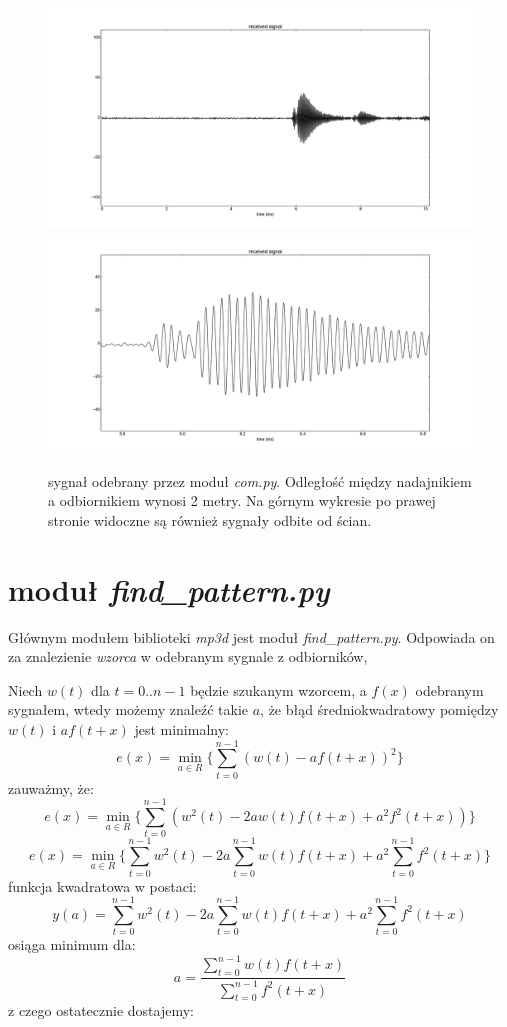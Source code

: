 \begin{figure}[h!]
    \centering
    \includegraphics[width=1.15\textwidth, trim= 47mm 0mm 0mm 0mm,clip]{com_output_2m_1}
    \includegraphics[width=1.15\textwidth, trim= 47mm 0mm 0mm 0mm,clip]{com_output_2m_2}
    \caption{sygnał odebrany przez moduł \textit{com.py}. 
    Odległość między nadajnikiem a odbiornikiem wynosi 2 metry.
    Na górnym wykresie po prawej stronie widoczne są również sygnały odbite od ścian.
    }
    \label{fig:com_output_2m}
\end{figure}


\section{moduł \textit{find\_pattern.py}}

Głównym modułem biblioteki \textit{mp3d} jest moduł \textit{find\_pattern.py}.
Odpowiada on za znalezienie \textit{wzorca} w odebranym sygnale z odbiorników,

Niech $w(t)$  dla $t = 0..n-1$ będzie szukanym wzorcem, a $f(x)$ odebranym sygnałem,
wtedy możemy znaleźć takie $a$, że błąd średniokwadratowy pomiędzy $w(t)$ i $a f(t+x)$ jest minimalny:
\[
  e(x) = \min_{a \in R} \{ \sum_{t=0}^{n-1}  (w(t) - a f(t+x))^2 \}
\]
zauważmy, że:
\[
  e(x) = \min_{a \in R} \{ \sum_{t=0}^{n-1}  (w^2(t) -2a w(t) f(t+x) + a^2 f^2(t+x)) \}
\]
\[
  e(x) = \min_{a \in R} \{ \sum_{t=0}^{n-1}  w^2(t) -2a \sum_{t=0}^{n-1}  w(t) f(t+x) + a^2 \sum_{t=0}^{n-1} f^2(t+x) \}
\]
funkcja kwadratowa w postaci:
\[
  y(a) = \sum_{t=0}^{n-1}  w^2(t) -2a \sum_{t=0}^{n-1}  w(t) f(t+x) + a^2 \sum_{t=0}^{n-1} f^2(t+x)
\]
osiąga minimum dla:
\[
 a = \frac{ \sum\limits_{t=0}^{n-1}  w(t) f(t+x) }{ \sum\limits_{t=0}^{n-1} f^2(t+x) }
\]
z czego ostatecznie dostajemy:

